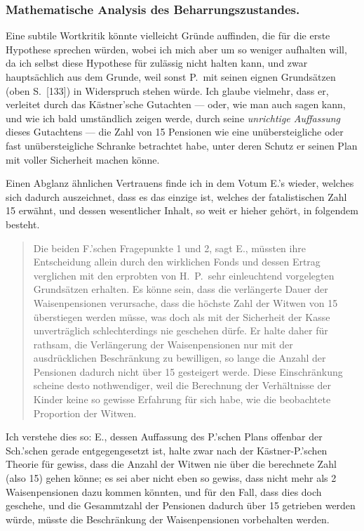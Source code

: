 \documentclass[12pt,a4paper]{article}
\begin{document}
\subsubsection*{Mathematische Analysis des Beharrungszustandes.}

Eine subtile Wortkritik k\"onnte vielleicht Gr\"unde auffinden, die f\"ur die erste Hypothese sprechen w\"urden, wobei ich mich aber um so weniger aufhalten will, da ich selbst diese Hypothese f\"ur zul\"assig nicht halten kann, und zwar haupts\"achlich aus dem Grunde, weil sonst P.\ mit seinen eignen Grunds\"atzen (oben S.\ [133]) in Widerspruch stehen w\"urde. Ich glaube vielmehr, dass er, verleitet durch das K\"astner'sche Gutachten --- oder, wie man auch sagen kann, und wie ich bald umst\"andlich zeigen werde, durch seine \textit{unrichtige Auffassung} dieses Gutachtens --- die Zahl von 15 Pensionen wie eine un\"ubersteigliche oder fast un\"ubersteigliche Schranke betrachtet habe, unter deren Schutz er seinen Plan mit voller Sicherheit machen k\"onne.

Einen Abglanz \"ahnlichen Vertrauens finde ich in dem Votum E.'s wieder, welches sich dadurch auszeichnet, dass es das einzige ist, welches der fatalistischen Zahl 15 erw\"ahnt, und dessen wesentlicher Inhalt, so weit er hieher geh\"ort, in folgendem besteht.

\begin{quote}
Die beiden F.'schen Fragepunkte 1 und 2, sagt E., m\"ussten ihre Entscheidung allein durch den wirklichen Fonds und dessen Ertrag verglichen mit den erprobten von H.\ P.\ sehr einleuchtend vorgelegten Grunds\"atzen erhalten. Es k\"onne sein, dass die verl\"angerte Dauer der Waisenpensionen verursache, dass die h\"ochste Zahl der Witwen von 15 \"uberstiegen werden m\"usse, was doch als mit der Sicherheit der Kasse unvertr\"aglich schlechterdings nie geschehen d\"urfe. Er halte daher f\"ur rathsam, die Verl\"angerung der Waisenpensionen nur mit der ausdr\"ucklichen Beschr\"ankung zu bewilligen, so lange die Anzahl der Pensionen dadurch nicht \"uber 15 gesteigert werde. Diese Einschr\"ankung scheine desto nothwendiger, weil die Berechnung der Verh\"altnisse der Kinder keine so gewisse Erfahrung f\"ur sich habe, wie die beobachtete Proportion der Witwen.
\end{quote}

Ich verstehe dies so: E., dessen Auffassung des P.'schen Plans offenbar der Sch.'schen gerade entgegengesetzt ist, halte zwar nach der K\"astner-P.'schen Theorie f\"ur gewiss, dass die Anzahl der Witwen nie \"uber die berechnete Zahl (also 15) gehen k\"onne; es sei aber nicht eben so gewiss, dass nicht mehr als 2 Waisenpensionen dazu kommen k\"onnten, und f\"ur den Fall, dass dies doch geschehe, und die Gesammtzahl der Pensionen dadurch \"uber 15 getrieben werden w\"urde, m\"usste die Beschr\"ankung der Waisenpensionen vorbehalten werden.
\end{document}
